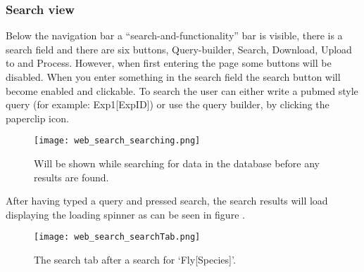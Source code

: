 \subsubsection{Search view}

Below the navigation bar a “search-and-functionality” bar is visible, there is a search field and there are six buttons, Query-builder, Search, Download, Upload to and Process. However, when first entering the page some buttons will be disabled. When you enter something in the search field the search button will become enabled and clickable. To search the user can either write a pubmed style query (for example: Exp1[ExpID]) or use the query builder, by clicking the paperclip icon.

\begin{figure}[h]
\centering
\texttt{[image: web\_search\_searching.png]}
\caption{\label{fig:web_search_searching}Will be shown while searching for data in the database before any results are found.}
\end{figure}

After having typed a query and pressed search, the search results will load displaying the loading spinner as can be seen in figure .
\begin{figure}[h]
\centering
\texttt{[image: web\_search\_searchTab.png]}
\caption{\label{fig:web_search_searchTab}The search tab after a search for ‘Fly[Species]’.}
\end{figure}

